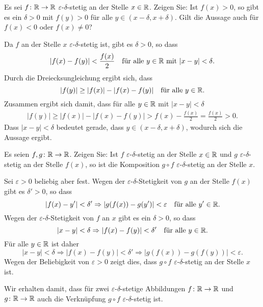 \documentclass[a4paper,10pt]{article}
\begin{document}
\begin{question}
 Es sei $f \colon \mathbb{R} \to \mathbb{R}$ $\varepsilon$-$\delta$-stetig an der Stelle $x \in \mathbb{R}$. Zeigen Sie: Ist $f(x) > 0$, so gibt es ein $\delta > 0$ mit $f(y) > 0$ für alle $y \in (x-\delta, x+\delta)$. Gilt die Aussage auch für $f(x) < 0$ oder $f(x) \neq 0$?
\end{question}
\begin{solution}
 Da $f$ an der Stelle $x$ $\varepsilon$-$\delta$-stetig ist, gibt es $\delta > 0$, so dass 
 \[
  |f(x) - f(y)| < \frac{f(x)}{2} \quad \text{für alle $y \in \mathbb{R}$ mit $|x-y| < \delta$}.
 \]
 Durch die Dreiecksungleichung ergibt sich, dass
 \[
  |f(y)| \geq |f(x)| - |f(x)-f(y)| \quad \text{für alle $y \in \mathbb{R}$}.
 \]
 Zusammen ergibt sich damit, dass für alle $y \in \mathbb{R}$ mit $|x-y| < \delta$
 \begin{align*}
  |f(y)|
  \geq |f(x)| - |f(x)-f(y)|
  > f(x) - \frac{f(x)}{2}
  = \frac{f(x)}{2}
  > 0.
 \end{align*}
 Dass $|x-y| < \delta$ bedeutet gerade, dass $y \in (x-\delta, x+\delta)$, wodurch sich die Aussage ergibt.
\end{solution}


\begin{question}
 Es seien $f, g \colon \mathbb{R} \to \mathbb{R}$. Zeigen Sie: Ist $f$ $\varepsilon$-$\delta$-stetig an der Stelle $x \in \mathbb{R}$ und $g$ $\varepsilon$-$\delta$-stetig an der Stelle $f(x)$, so ist die Komposition $g \circ f$ $\varepsilon$-$\delta$-stetig an der Stelle $x$. 
\end{question}
\begin{solution}
 Sei $\varepsilon > 0$ beliebig aber fest. Wegen der $\varepsilon$-$\delta$-Stetigkeit von $g$ an der Stelle $f(x)$ gibt es $\delta' > 0$, so dass
 \[
  |f(x)-y'| < \delta' \Rightarrow |g(f(x))-g(y')| < \varepsilon
  \quad \text{für alle $y' \in \mathbb{R}$}.
 \]
 Wegen der $\varepsilon$-$\delta$-Stetigkeit von $f$ an $x$ gibt es ein $\delta > 0$, so dass
 \[
  |x-y| < \delta \Rightarrow |f(x)-f(y)| < \delta'
  \quad \text{für alle $y \in \mathbb{R}$}.
 \]
 Für alle $y \in \mathbb{R}$ ist daher
 \[
  |x-y| < \delta
  \Rightarrow |f(x)-f(y)| < \delta'
  \Rightarrow |g(f(x))-g(f(y))| < \varepsilon.
 \]
 Wegen der Beliebigkeit von $\varepsilon > 0$ zeigt dies, dass $g \circ f$ $\varepsilon$-$\delta$-stetig an der Stelle $x$ ist.
\end{solution}


Wir erhalten damit, dass für zwei $\varepsilon$-$\delta$-stetige Abbildungen $f \colon \mathbb{R} \to \mathbb{R}$ und $g \colon \mathbb{R} \to \mathbb{R}$ auch die Verknüpfung $g \circ f$ $\varepsilon$-$\delta$-stetig ist.
\end{document}
